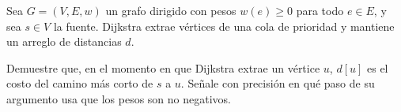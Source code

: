 
Sea $G = (V, E, w)$ un grafo dirigido con pesos $w(e) \ge 0$ para todo $e \in E$, y sea $s \in V$ la fuente. Dijkstra extrae vértices de una cola de prioridad y mantiene un arreglo de distancias $d$.

Demuestre que, en el momento en que Dijkstra extrae un vértice $u$, $d[u]$ es el costo del camino más corto de $s$ a $u$. Señale con precisión en qué paso de su argumento usa que los pesos son no negativos.

